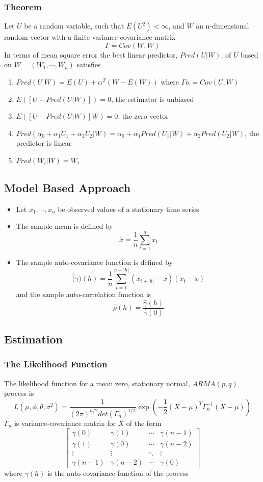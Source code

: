 \documentclass[11pt]{article}
\newcommand{\cv}[1]{\begin{bmatrix} #1 \end{bmatrix}}
\begin{document}
\subsubsection{Theorem}
Let $U$ be a random variable, such that $E(U^2)<\infty$, and $W$ an n-dimensional random vector with a 
finite variance-covariance matrix \[\Gamma=Cov(W,W)\]   
In terms of mean square error the best linear predictor, $Pred(U|W)$, of $U$ based on $W=(W_1,\cdots,W_n)$ satisfies 
\begin{enumerate}
    \item $Pred(U|W)=E(U)+\alpha^T(W-E(W))$ where $\Gamma \alpha = Cov(U,W)$
    \item $E([U-Pred(U|W)]) = 0$, the estimator is unbiased 
    \item $E([U-Pred(U|W)]W) = 0$, the zero vector 
    \item $Pred(\alpha_0+\alpha_1U_1+\alpha_2U_2|W)=\alpha_0+\alpha_1Pred(U_1|W)+\alpha_2Pred(U_2|W)$, the predictor is linear 
    \item $Pred(W_i|W)=W_i$
\end{enumerate}
\subsection{Model Based Approach}
\begin{itemize}
    \item Let $x_1,\cdots,x_n$ be observed values of a stationary time series 
    \item The sample mean is defined by \[\overline{x}=\frac{1}{n}\sum_{t=1}^{n}x_t\]   
    \item The sample auto-covariance function is defined by 
    \[\hat(\gamma)(h)=\frac{1}{n}\sum_{t=1}^{n-|h|}(x_{t+|h|}-\overline{x})(x_t-\overline{x})\]  
    and the sample auto-correlation function is \[\hat{\rho}(h)= \frac{\hat{\gamma}(h)}{\hat{\gamma}(0)}\]     
\end{itemize}
\subsection{Estimation}
\subsubsection{The Likelihood Function}
The likelihood function for a mean zero, stationary normal, $ARMA(p,q)$ process is 
\[L(\mu,\phi,\theta,\sigma^2)=\frac{1}{(2\pi)^{n/2}det(\Gamma_n)^{1/2}}\exp\left(-\frac{1}{2}(X-\mu)^T\Gamma_n^{-1}(X-\mu)\right)\]    
$\Gamma_n$ is variance-covariance matrix for $X$ of the form 
\[\cv{\gamma(0) & \gamma(1) & \cdots & \gamma(n-1)\\\gamma(1) & \gamma(0) & \cdots & \gamma(n-2)\\\vdots & \vdots & \ddots & \vdots\\\gamma(n-1) & \gamma(n-2) & \cdots & \gamma(0)}\]    
where $\gamma(h)$ is the auto-covariance function of the process
\end{document}
